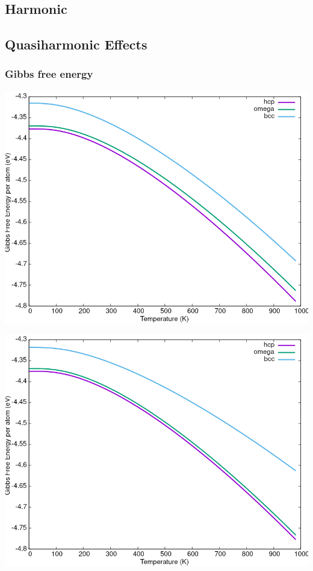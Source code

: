 \documentclass[11pt]{article}
\begin{document}
\subsection{Harmonic}
\label{sec:org9565b19}

\subsection{Quasiharmonic Effects}
\label{sec:org658828b}

\subsubsection{Gibbs free energy}
\label{sec:orgd1ff7e7}

\begin{center}
\includegraphics[width=.9\linewidth]{Images/gibbs_free_energy_per_atom_2020-04-02.png}
\end{center}
\begin{center}
\includegraphics[width=.9\linewidth]{Images/gibbs_free_energy_per_atom_2020-04-02_4x4x4.png}
\end{center}
\end{document}
